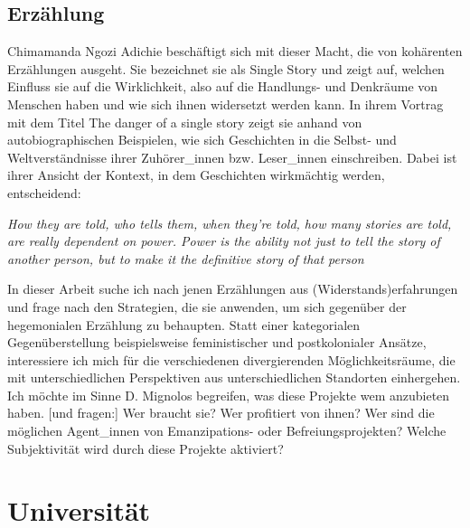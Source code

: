 \documentclass[11pt]{article}
\newenvironment{myenv}{\begin{adjustwidth}{2cm}{}}{\end{adjustwidth}}
\begin{document}
\subsection{Erzählung} Chimamanda Ngozi Adichie beschäftigt sich mit dieser
Macht, die von kohärenten Erzählungen ausgeht. Sie bezeichnet sie als Single
Story und zeigt auf, welchen Einfluss sie auf die Wirklichkeit, also auf die
Handlungs- und Denkräume von Menschen haben und wie sich ihnen widersetzt werden
kann. In ihrem Vortrag mit dem Titel \glqq The danger of a single story \grqq
zeigt sie anhand von autobiographischen Beispielen, wie sich Geschichten in die
Selbst- und Weltverständnisse ihrer Zuhörer\_innen bzw.  Leser\_innen
einschreiben. Dabei ist ihrer Ansicht der Kontext, in dem Geschichten
wirkmächtig werden, entscheidend: \begin{myenv}

  \textit{ \glqq How they are told, who tells them, when they're told, how many
stories are told, are really dependent on power. Power is the ability not just
to tell the story of another person, but to make it the definitive story of that
person \grqq \footnotemark {} } \end{myenv}

In dieser Arbeit suche ich nach jenen Erzählungen aus (Widerstands)erfahrungen
und frage nach den Strategien, die sie anwenden, um sich gegenüber der
hegemonialen Erzählung zu behaupten. Statt einer kategorialen Gegenüberstellung
beispielsweise feministischer und postkolonialer Ansätze, interessiere ich mich
für die verschiedenen divergierenden Möglichkeitsräume, die mit
unterschiedlichen Perspektiven aus unterschiedlichen Standorten einhergehen. Ich
möchte im Sinne D. Mignolos begreifen, \glqq [...] was diese Projekte wem
anzubieten haben. [und fragen:] Wer braucht sie? Wer profitiert von ihnen? Wer
sind die möglichen Agent\_innen von Emanzipations- oder Befreiungsprojekten?
Welche Subjektivität wird durch diese Projekte aktiviert? \grqq

\section{Universität}
\end{document}
